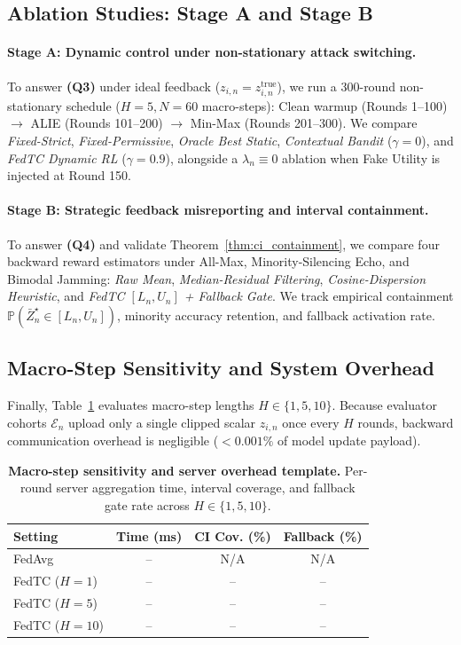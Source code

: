 \subsection{Ablation Studies: Stage A and Stage B}
\label{sec:ablation_studies}

\paragraph{Stage A: Dynamic control under non-stationary attack switching.}
To answer \textbf{(Q3)} under ideal feedback ($z_{i,n} = z_{i,n}^{\mathrm{true}}$), we run a 300-round non-stationary schedule ($H=5, N=60$ macro-steps): Clean warmup (Rounds 1--100) $\to$ ALIE (Rounds 101--200) $\to$ Min-Max (Rounds 201--300). We compare \textit{Fixed-Strict}, \textit{Fixed-Permissive}, \textit{Oracle Best Static}, \textit{Contextual Bandit} ($\gamma=0$), and \textit{FedTC Dynamic RL} ($\gamma=0.9$), alongside a $\lambda_n \equiv 0$ ablation when Fake Utility is injected at Round 150.

\paragraph{Stage B: Strategic feedback misreporting and interval containment.}
To answer \textbf{(Q4)} and validate Theorem~\ref{thm:ci_containment}, we compare four backward reward estimators under All-Max, Minority-Silencing Echo, and Bimodal Jamming: \textit{Raw Mean}, \textit{Median-Residual Filtering}, \textit{Cosine-Dispersion Heuristic}, and \textit{FedTC $[L_n, U_n]$ + Fallback Gate}. We track empirical containment $\mathbb{P}(\bar{Z}_n^\star \in [L_n, U_n])$, minority accuracy retention, and fallback activation rate.

\subsection{Macro-Step Sensitivity and System Overhead}
\label{sec:overhead}

Finally, Table~\ref{tab:overhead} evaluates macro-step lengths $H \in \{1, 5, 10\}$. Because evaluator cohorts $\mathcal{E}_n$ upload only a single clipped scalar $z_{i,n}$ once every $H$ rounds, backward communication overhead is negligible ($< 0.001\%$ of model update payload).

\begin{table}[t]
  \centering
  \caption{\textbf{Macro-step sensitivity and server overhead template.} Per-round server aggregation time, interval coverage, and fallback gate rate across $H \in \{1, 5, 10\}$.}
  \label{tab:overhead}
  \setlength{\tabcolsep}{3pt}
  \footnotesize
  \begin{tabular}{lccc}
    \toprule
    \textbf{Setting} & \textbf{Time (ms)} & \textbf{CI Cov. (\%)} & \textbf{Fallback (\%)} \\
    \midrule
    FedAvg & -- & N/A & N/A \\
    FedTC ($H=1$) & -- & -- & -- \\
    FedTC ($H=5$) & -- & -- & -- \\
    FedTC ($H=10$) & -- & -- & -- \\
    \bottomrule
  \end{tabular}
\end{table}
